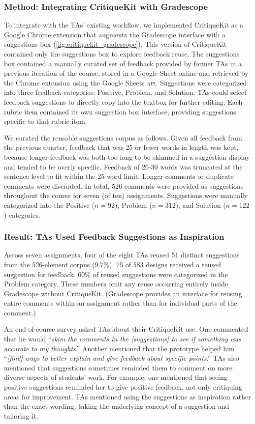 \subsubsection{Method: Integrating CritiqueKit with Gradescope}
To integrate with the TAs' existing workflow, we implemented CritiqueKit as a Google Chrome extension that augments the Gradescope interface with a suggestions box (\autoref{fig:critiquekit_gradescope}). This version of CritiqueKit contained only the suggestions box to explore feedback reuse. The suggestions box contained a manually curated set of feedback provided by former TAs in a previous iteration of the course, stored in a Google Sheet online and retrieved by the Chrome extension using the Google Sheets \textsc{api}. Suggestions were categorized into three feedback categories: Positive, Problem, and Solution. TAs could select feedback suggestions to directly copy into the textbox for further editing. Each rubric item contained its own suggestion box interface, providing suggestions specific to that rubric item.

We curated the reusable suggestions corpus as follows. Given all feedback from the previous quarter, feedback that was 25 or fewer words in length was kept, because longer feedback was both too long to be skimmed in a suggestion display and tended to be overly specific. Feedback of 26-30 words was truncated at the sentence level to fit within the 25-word limit. Longer comments or duplicate comments were discarded. In total, 526 comments were provided as suggestions throughout the course for seven (of ten) assignments. Suggestions were manually categorized into the Positive ($n = 92$), Problem ($n = 312$), and Solution ($n = 122$) categories.

\subsubsection{Result: TAs Used Feedback Suggestions as Inspiration}
Across seven assignments, four of the eight TAs reused 51 distinct suggestions from the 526-element corpus (9.7\%). 75 of 583 designs received a reused suggestion for feedback. 60\% of reused suggestions were categorized in the Problem category. These numbers omit any reuse occurring entirely inside Gradescope without CritiqueKit. (Gradescope provides an interface for reusing entire comments within an assignment rather than for individual parts of the comment.) 

An end-of-course survey asked TAs about their CritiqueKit use. One commented that he would ``\textit{skim the comments in the [suggestions] to see if something was accurate to my thoughts}.'' Another mentioned that the prototype helped him ``\textit{[find] ways to better explain and give feedback about specific points}.'' TAs also mentioned that suggestions sometimes reminded them to comment on more diverse aspects of students' work. For example, one mentioned that seeing positive suggestions reminded her to give positive feedback, not only critiquing areas for improvement. TAs mentioned using the suggestions as inspiration rather than the exact wording, taking the underlying concept of a suggestion and tailoring it.


